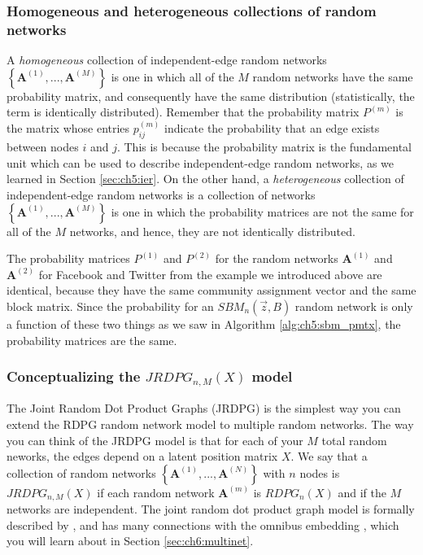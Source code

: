 \subsubsection{Homogeneous and heterogeneous collections of random networks}
A \textit{homogeneous} collection of independent-edge random networks $\left\{\mathbf A^{(1)}, ..., \mathbf A^{(M)}\right\}$ is one in which {all} of the $M$ random networks have the {same probability matrix}, and consequently have the same distribution (statistically, the term is {identically distributed}). Remember that the probability matrix $P^{(m)}$ is the matrix whose entries $p^{(m)}_{ij}$ indicate the probability that an edge exists between nodes $i$ and $j$. This is because the probability matrix is the fundamental unit which can be used to describe independent-edge random networks, as we learned in Section \ref{sec:ch5:ier}. On the other hand, a \textit{heterogeneous} collection of independent-edge random networks is a collection of networks $\left\{\mathbf A^{(1)}, ..., \mathbf A^{(M)}\right\}$ is one in which the probability matrices are {not} the same for all of the $M$ networks, and hence, they are {not} identically distributed. 

The probability matrices $P^{(1)}$ and $P^{(2)}$ for the random networks $\mathbf A^{(1)}$ and $\mathbf A^{(2)}$ for Facebook and Twitter from the example we introduced above are identical, because they have the same community assignment vector and the same block matrix. Since the probability for an $SBM_n(\vec z, B)$ random network is only a function of these two things as we saw in Algorithm \ref{alg:ch5:sbm_pmtx}, the probability matrices are the same.

\subsubsection{Conceptualizing the $JRDPG_{n,M}(X)$ model}
The Joint Random Dot Product Graphs (JRDPG) is the simplest way you can extend the RDPG random network model to multiple random networks. The way you can think of the JRDPG model is that for each of your $M$ total random neworks, the edges depend on a latent position matrix $X$. We say that a collection of random networks $\left\{\mathbf A^{(1)}, ..., \mathbf A^{(N)}\right\}$ with $n$ nodes is $JRDPG_{n,M}(X)$ if each random network $\mathbf A^{(m)}$ is $RDPG_n(X)$ and if the $M$ networks are independent. The joint random dot product graph model is formally described by \cite{Athreya2017Jan}, and has many connections with the omnibus embedding \cite{Levin2017}, which you will learn about in Section \ref{sec:ch6:multinet}.


